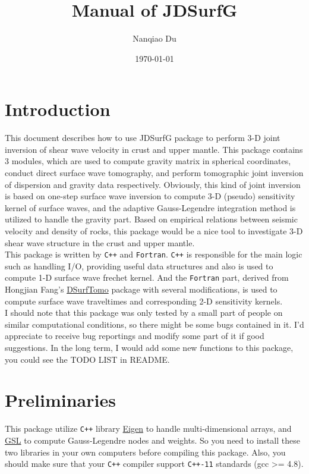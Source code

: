 \documentclass[UTF8]{article}
\title{Manual of JDSurfG}
\author{Nanqiao Du}
\date{\today}
\begin{document}
   \maketitle
   \tableofcontents
   \newpage
   \section{Introduction}
   This document describes how to use JDSurfG package to perform 3-D joint inversion of 
   shear wave velocity in crust and upper mantle. This package contains 3 modules, which are 
   used to compute gravity matrix in spherical coordinates, conduct direct surface wave 
   tomography, and perform tomographic joint inversion of dispersion and gravity data 
   respectively. Obviously, this kind of joint inversion is based on one-step surface wave 
   inversion to compute 3-D (pseudo) sensitivity kernel of surface waves, and the adaptive 
   Gauss-Legendre integration method is utilized to handle the gravity part. Based on 
   empirical relations between seismic velocity and density of rocks, this package would be 
   a nice tool to investigate 3-D shear wave structure in the crust and upper mantle.\\

   This package is written by \verb!C++! and \verb!Fortran!. \verb!C++! is responsible for the main logic such as 
   handling I/O, providing useful data structures and also is used to compute 1-D surface 
   wave frechet kernel. And the \verb!Fortran! part, derived from Hongjian Fang's 
   \href{https://github.com/HongjianFang/DSurfTomo/tree/stable/src}{DSurfTomo} package 
   with several modifications, is used to compute surface wave traveltimes and corresponding
   2-D sensitivity kernels.\\

   I should note that this package was only tested by a small part of people on similar computational
   conditions, so there might be some bugs contained in it. I'd appreciate to receive bug reportings 
   and modify some part of it if good suggestions. In the long term, I would add some new functions 
   to this package, you could see the TODO LIST in README.

   \section{Preliminaries}
   This package utilize \verb!C++!  library \href{http://eigen.tuxfamily.org/index.php?title=Main_Page}{Eigen}
   to handle multi-dimensional arrays, and \href{http://www.gnu.org/software/gsl/}{GSL} to compute 
   Gauss-Legendre nodes and weights. So you need to install these two libraries in your own 
   computers before compiling this package. Also, you should make sure that your \verb!C++! compiler 
   support \verb!C++-11! standards (gcc >= 4.8).
\end{document}
